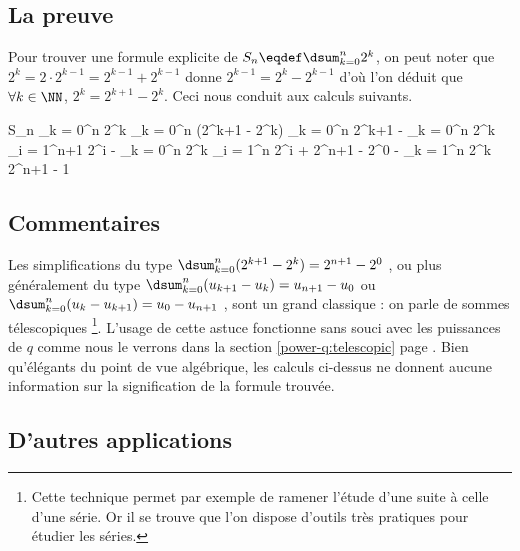 \subsection{La preuve}

Pour trouver une formule explicite de $S_n \eqdef \dsum_{k = 0}^{n} 2^k$, on peut noter que
$2^k = 2 \cdot 2^{k-1} = 2^{k-1} + 2^{k-1}$
donne
$2^{k-1} = 2^k - 2^{k-1}$
d'où l'on déduit que
$\forall k \in \NN$, $2^k = 2^{k+1} - 2^k$.
Ceci nous conduit aux calculs suivants.

\begin{focusproof}
\begin{explain}[style = sar]
	S_n 
		\explnext[\eqdef]{}
	\dsum_{k = 0}^{n} 2^k
		\explnext{}
	\dsum_{k = 0}^{n} (2^{k+1} - 2^k)
		\explnext{}
	\dsum_{k = 0}^{n} 2^{k+1} - \dsum_{k = 0}^{n} 2^k
	\dsum_{i = 1}^{n+1} 2^{i} - \dsum_{k = 0}^{n} 2^k
	\dsum_{i = 1}^{n} 2^{i} + 2^{n+1} - 2^0 - \dsum_{k = 1}^{n} 2^k
		\explnext{}
	2^{n+1} - 1
\end{explain}
\end{focusproof}




\subsection{Commentaires}

Les simplifications du type
$\dsum_{k = 0}^{n} (2^{k+1} - 2^k) = 2^{n+1} - 2^0$ ,
ou plus généralement du type
$\dsum_{k = 0}^{n} (u_{k+1} - u_{k}) = u_{n+1} - u_0$
ou
$\dsum_{k = 0}^{n} (u_{k} - u_{k+1}) = u_0 - u_{n+1}$ ,
sont un grand classique : on parle de \og sommes télescopiques \fg{}
\footnote{
	Cette technique permet par exemple de ramener l'étude d'une suite à celle d'une série.
	Or il se trouve que l'on dispose d'outils très pratiques pour étudier les séries.
}.
L'usage de cette astuce fonctionne sans souci avec les puissances de $q$ comme nous le verrons dans la section \ref{power-q:telescopic} page \pageref{power-q:telescopic}.
Bien qu'élégants du point de vue algébrique, les calculs ci-dessus ne donnent aucune information sur la signification de la formule trouvée.




\subsection{D'autres applications}

